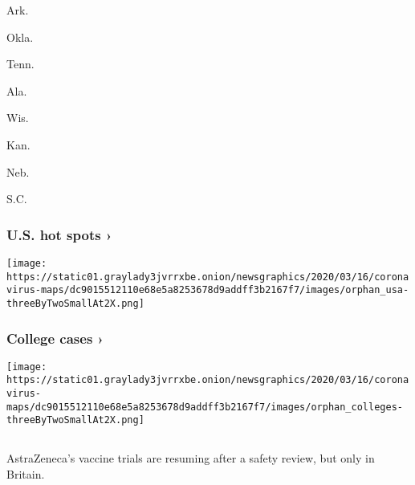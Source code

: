 Ark.
\href{https://www.nytimes3xbfgragh.onion/interactive/2020/us/oklahoma-coronavirus-cases.html}{}

Okla.
\href{https://www.nytimes3xbfgragh.onion/interactive/2020/us/tennessee-coronavirus-cases.html}{}

Tenn.
\href{https://www.nytimes3xbfgragh.onion/interactive/2020/us/alabama-coronavirus-cases.html}{}

Ala.
\href{https://www.nytimes3xbfgragh.onion/interactive/2020/us/wisconsin-coronavirus-cases.html}{}

Wis.
\href{https://www.nytimes3xbfgragh.onion/interactive/2020/us/kansas-coronavirus-cases.html}{}

Kan.
\href{https://www.nytimes3xbfgragh.onion/interactive/2020/us/nebraska-coronavirus-cases.html}{}

Neb.
\href{https://www.nytimes3xbfgragh.onion/interactive/2020/us/south-carolina-coronavirus-cases.html}{}

S.C.

\href{https://www.nytimes3xbfgragh.onion/interactive/2020/us/coronavirus-us-cases.html}{}

\hypertarget{us-hot-spots-}{%
\subsubsection{U.S. hot spots ›}\label{us-hot-spots-}}

\texttt{[image: https://static01.graylady3jvrrxbe.onion/newsgraphics/2020/03/16/coronavirus-maps/dc9015512110e68e5a8253678d9addff3b2167f7/images/orphan\_usa-threeByTwoSmallAt2X.png]}
\href{https://www.nytimes3xbfgragh.onion/interactive/2020/us/covid-college-cases-tracker.html}{}

\hypertarget{college-cases-}{%
\subsubsection{College cases ›}\label{college-cases-}}

\texttt{[image: https://static01.graylady3jvrrxbe.onion/newsgraphics/2020/03/16/coronavirus-maps/dc9015512110e68e5a8253678d9addff3b2167f7/images/orphan\_colleges-threeByTwoSmallAt2X.png]}

\hypertarget{-1}{%
\subsection{}\label{-1}}

AstraZeneca's vaccine trials are resuming after a safety review, but
only in Britain.

